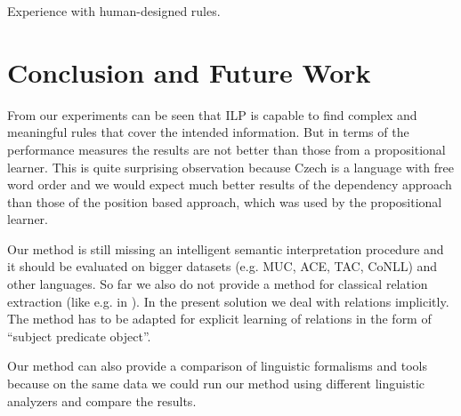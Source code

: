 Experience with human-designed rules.










\section{Conclusion and Future Work}
From our experiments can be seen that ILP is capable to find complex and meaningful rules that cover the intended information. But in terms of the performance measures the results are not better than those from a propositional learner. This is quite surprising observation because Czech is a language with free word order and we would expect much better results of the dependency approach than those of the position based approach, which was used by the propositional learner.

Our method is still missing an intelligent semantic interpretation procedure and it should be evaluated on bigger datasets (e.g. MUC, ACE, TAC, CoNLL) and other languages. So far we also do not provide a method for classical relation extraction (like e.g. in \citep{Bunescu:DependencyPaths}). In the present solution we deal with relations implicitly. The method has to be adapted for explicit learning of relations in the form of ``subject predicate object''.

Our method can also provide a comparison of linguistic formalisms and tools because on the same data we could run our method using different linguistic analyzers and compare the results.

